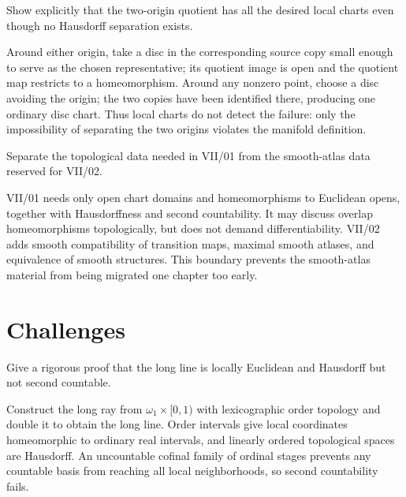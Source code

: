 \begin{problem}\label{prob:vii01-11}
Show explicitly that the two-origin quotient has all the desired local charts even though no Hausdorff separation exists.
\end{problem}
\begin{solution}
Around either origin, take a disc in the corresponding source copy small enough to serve as the chosen representative; its quotient image is open and the quotient map restricts to a homeomorphism.  Around any nonzero point, choose a disc avoiding the origin; the two copies have been identified there, producing one ordinary disc chart.  Thus local charts do not detect the failure: only the impossibility of separating the two origins violates the manifold definition.
\end{solution}

\begin{problem}\label{prob:vii01-12}
Separate the topological data needed in VII/01 from the smooth-atlas data reserved for VII/02.
\end{problem}
\begin{solution}
VII/01 needs only open chart domains and homeomorphisms to Euclidean opens, together with Hausdorffness and second countability.  It may discuss overlap homeomorphisms topologically, but does not demand differentiability.  VII/02 adds smooth compatibility of transition maps, maximal smooth atlases, and equivalence of smooth structures.  This boundary prevents the smooth-atlas material from being migrated one chapter too early.
\end{solution}

\section{Challenges}
\begin{problem}[Challenge]\label{chal:vii01-01}
Give a rigorous proof that the long line is locally Euclidean and Hausdorff but not second countable.
\end{problem}
\begin{solution}
Construct the long ray from \(\omega_1\times[0,1)\) with lexicographic order topology and double it to obtain the long line.  Order intervals give local coordinates homeomorphic to ordinary real intervals, and linearly ordered topological spaces are Hausdorff.  An uncountable cofinal family of ordinal stages prevents any countable basis from reaching all local neighborhoods, so second countability fails.
\end{solution}

